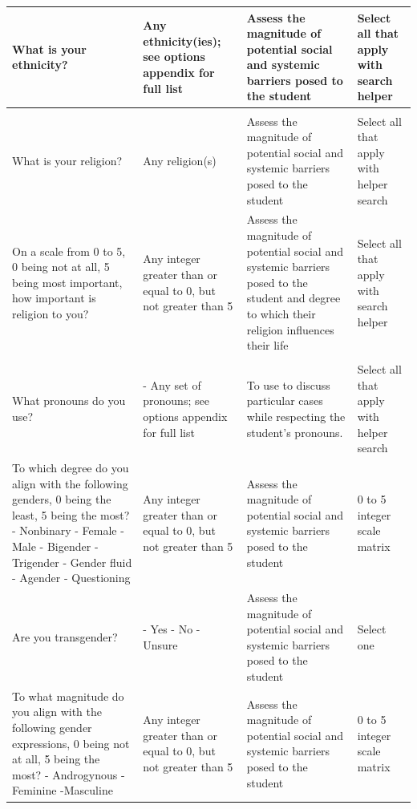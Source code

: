 \documentclass[10pt, twocolumn]{article}
\begin{document}
\begin{xltabular}{\textwidth}{|p{0.3\textwidth}|p{0.3\textwidth}|p{0.2\textwidth}|X|}
    What is your ethnicity? & Any ethnicity(ies); see options appendix for full list & Assess the magnitude of potential social and systemic barriers posed to the student & Select all that apply with search helper \\ \hline
     \\ \hline
    What is your religion? & Any religion(s) & Assess the magnitude of potential social and systemic barriers posed to the student & Select all that apply with helper search \\ \hline 
    On a scale from 0 to 5, 0 being not at all, 5 being most important, how important is religion to you? & Any integer greater than or equal to 0, but not greater than 5 & Assess the magnitude of potential social and systemic barriers posed to the student and degree to which their religion influences their life & Select all that apply with search helper \\ 
    \hline 
     \\ \hline
    What pronouns do you use? & - Any set of pronouns; see options appendix for full list & To use to discuss particular cases while respecting the student's pronouns. & Select all that apply with helper search \\ \hline 
    To which degree do you align with the following genders, 0 being the least, 5 being the most? \newline - Nonbinary \newline - Female \newline - Male \newline - Bigender \newline - Trigender \newline - Gender fluid \newline - Agender \newline - Questioning & Any integer greater than or equal to 0, but not greater than 5 & Assess the magnitude of potential social and systemic barriers posed to the student & 0 to 5 integer scale matrix \\ \hline 
    Are you transgender? & - Yes \newline - No \newline - Unsure & Assess the magnitude of potential social and systemic barriers posed to the student & Select one \\ \hline 
    To what magnitude do you align with the following gender expressions, 0 being not at all, 5 being the most? \newline - Androgynous \newline - Feminine \newline -Masculine & Any integer greater than or equal to 0, but not greater than 5 & Assess the magnitude of potential social and systemic barriers posed to the student & 0 to 5 integer scale matrix \\ \hline 

\end{xltabular}
\end{document}
